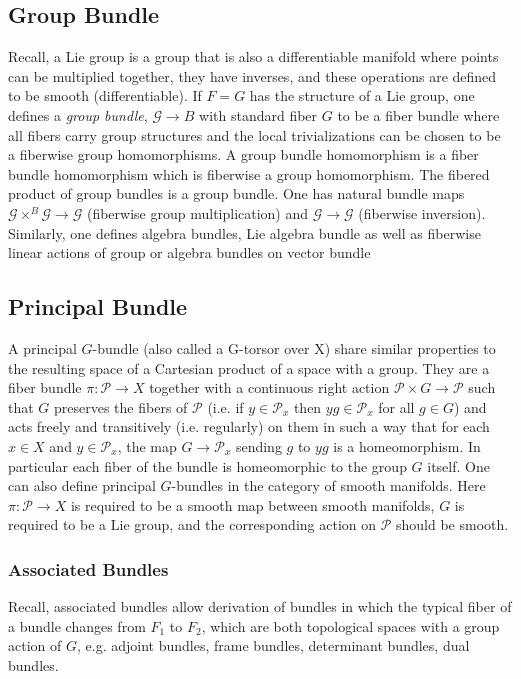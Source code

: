 \documentclass{article}
\theoremstyle{definition}
\begin{document}
\subsection{Group Bundle}

    Recall, a Lie group is a group that is also a differentiable manifold where points can be multiplied together, they have inverses, and these operations are defined to be smooth (differentiable). If $F = G$ has the structure of a Lie group, one defines a \textit{group bundle}, $\mathcal G \rightarrow B$ with standard fiber $G$ to be a fiber bundle where all fibers carry group structures and the local trivializations can be chosen to be a fiberwise group homomorphisms. A group bundle homomorphism is a fiber bundle homomorphism which is fiberwise a group homomorphism. The fibered product of group bundles is a group bundle. One has natural bundle maps $\mathcal G \times^B \mathcal G \rightarrow \mathcal G$ (fiberwise group multiplication) and $\mathcal G \rightarrow \mathcal G $ (fiberwise inversion). Similarly, one defines algebra bundles, Lie algebra bundle as well as fiberwise linear actions of group or algebra bundles on vector bundle


\subsection{Principal Bundle}
     A principal $G$-bundle (also called a G-torsor over X) share similar properties to the resulting space of a Cartesian product of a space with a group. They are a fiber bundle $\pi: \mathcal P \rightarrow X$ together with a continuous right action $\mathcal P \times G \rightarrow \mathcal P$ such that $G$ preserves the fibers of $\mathcal P$ (i.e. if $y \in \mathcal P_x$ then $yg \in \mathcal P_x$ for all $g \in G$) and acts freely and transitively (i.e. regularly) on them in such a way that for each $x\in X$ and $y \in \mathcal P_x$, the map $G \rightarrow \mathcal P_x$ sending $g$ to $yg$ is a homeomorphism. In particular each fiber of the bundle is homeomorphic to the group $G$ itself. One can also define principal $G$-bundles in the category of smooth manifolds. Here $\pi : \mathcal P \rightarrow X$ is required to be a smooth map between smooth manifolds, $G$ is required to be a Lie group, and the corresponding action on $\mathcal P$ should be smooth. 

\subsubsection{Associated Bundles}
    Recall, associated bundles allow derivation of bundles in which the typical fiber of a bundle changes from $F_{1}$ to $F_{2}$, which are both topological spaces with a group action of $G$, e.g. adjoint bundles, frame bundles, determinant bundles, dual bundles. 
    
\end{document}

